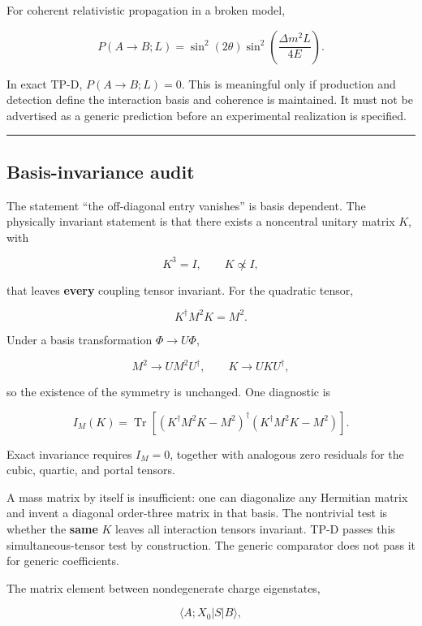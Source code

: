 \documentclass[
]{article}
\begin{document}
For coherent relativistic propagation in a broken model,

\[
P(A\to B;L)=\sin^2(2\theta)
\sin^2\!\left(\frac{\Delta m^2L}{4E}\right).
\]

In exact TP-D, \(P(A\to B;L)=0\). This is meaningful only if production
and detection define the interaction basis and coherence is maintained.
It must not be advertised as a generic prediction before an experimental
realization is specified.

\begin{center}\rule{0.5\linewidth}{0.5pt}\end{center}

\hypertarget{basis-invariance-audit}{%
\subsection{Basis-invariance audit}\label{basis-invariance-audit}}

The statement ``the off-diagonal entry vanishes'' is basis dependent.
The physically invariant statement is that there exists a noncentral
unitary matrix \(K\), with

\[
K^3=I,\qquad K\not\propto I,
\]

that leaves \textbf{every} coupling tensor invariant. For the quadratic
tensor,

\[
K^\dagger M^2K=M^2.
\]

Under a basis transformation \(\Phi\to U\Phi\),

\[
M^2\to UM^2U^\dagger,\qquad K\to UKU^\dagger,
\]

so the existence of the symmetry is unchanged. One diagnostic is

\[
I_M(K)=\operatorname{Tr}\!\left[
(K^\dagger M^2K-M^2)^\dagger(K^\dagger M^2K-M^2)
\right].
\]

Exact invariance requires \(I_M=0\), together with analogous zero
residuals for the cubic, quartic, and portal tensors.

A mass matrix by itself is insufficient: one can diagonalize any
Hermitian matrix and invent a diagonal order-three matrix in that basis.
The nontrivial test is whether the \textbf{same} \(K\) leaves all
interaction tensors invariant. TP-D passes this simultaneous-tensor test
by construction. The generic comparator does not pass it for generic
coefficients.

The matrix element between nondegenerate charge eigenstates,

\[
\langle A;X_0|S|B\rangle,
\]
\end{document}
